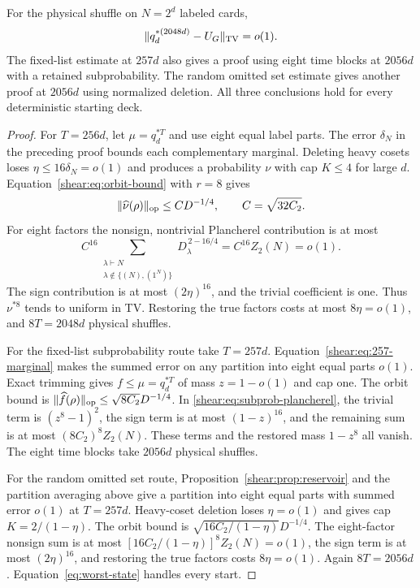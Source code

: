 \begin{theorem}
\label{shear:thm:2048}
For the physical shuffle on \(N=2^d\) labeled cards,
\begin{equation}
 \|q_d^{*(2048d)}-U_G\|_{\mathrm{TV}}=o(1).
 \label{shear:eq:2048}
\end{equation}
The fixed-list estimate at \(257d\) also gives a proof using eight time blocks
at \(2056d\) with a retained subprobability. The random omitted set
estimate gives another proof at \(2056d\) using normalized deletion.
All three conclusions hold for every deterministic starting deck.
\end{theorem}
\begin{proof}
For \(T=256d\), let \(\mu=q_d^{*T}\) and use eight equal label parts.
The error \(\delta_N\) in the preceding proof bounds each complementary
marginal. Deleting heavy cosets loses
\(\eta\le16\delta_N=o(1)\) and produces a probability \(\nu\) with
cap \(K\le4\) for large \(d\). Equation~\eqref{shear:eq:orbit-bound}
with \(r=8\) gives
\[
 \|\widehat\nu(\rho)\|_{\mathrm{op}}
 \le C D^{-1/4},\qquad C=\sqrt{32C_2}.
\]
For eight factors the nonsign, nontrivial Plancherel contribution is
at most
\[
 C^{16}\sum_{\substack{\lambda\vdash N\\
                        \lambda\notin\{(N),(1^N)\}}}
 D_\lambda^{\,2-16/4}=C^{16}Z_2(N)=o(1).
\]
The sign contribution is at most \((2\eta)^{16}\), and the trivial
coefficient is one. Thus \(\nu^{*8}\) tends to uniform in TV.
Restoring the true factors costs at most \(8\eta=o(1)\), and
\(8T=2048d\) physical shuffles.

For the fixed-list subprobability route take \(T=257d\).
Equation~\eqref{shear:eq:257-marginal} makes the summed error on any
partition into eight equal parts \(o(1)\). Exact trimming gives \(f\le\mu=q_d^{*T}\)
of mass \(z=1-o(1)\) and cap one. The orbit bound is
\(\|\widehat f(\rho)\|_{\mathrm{op}}\le\sqrt{8C_2}D^{-1/4}\).
In \eqref{shear:eq:subprob-plancherel}, the trivial term is
\((z^8-1)^2\), the sign term is at most \((1-z)^{16}\), and the
remaining sum is at most \((8C_2)^8Z_2(N)\). These terms and the
restored mass \(1-z^8\) all vanish. The eight time blocks take \(2056d\)
physical shuffles.

For the random omitted set route, Proposition~\ref{shear:prop:reservoir}
and the partition averaging above give a partition into eight equal parts with
summed error \(o(1)\) at \(T=257d\).
Heavy-coset deletion loses \(\eta=o(1)\) and gives cap
\(K=2/(1-\eta)\). The orbit bound is
\(\sqrt{16C_2/(1-\eta)}D^{-1/4}\). The eight-factor nonsign sum is
at most \([16C_2/(1-\eta)]^8Z_2(N)=o(1)\), the sign term is at most
\((2\eta)^{16}\), and restoring the true factors costs \(8\eta=o(1)\).
Again \(8T=2056d\). Equation~\eqref{eq:worst-state} handles every start.
\end{proof}

